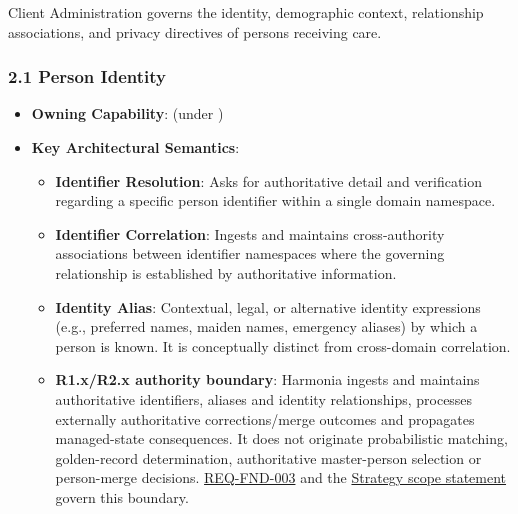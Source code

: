 Client Administration governs the identity, demographic context, relationship associations, and privacy directives of persons receiving care.

\label{rad:em:15}
\subsubsection*{2.1 Person Identity}
\label{rad:em:16}

\begin{itemize}

\item
\textbf{Owning Capability}: \texttt{} (under \texttt{})



\item
\textbf{Key Architectural Semantics}:


\begin{itemize}

\item
\textbf{Identifier Resolution}: Asks for authoritative detail and verification regarding a specific person identifier within a single domain namespace.



\item
\textbf{Identifier Correlation}: Ingests and maintains cross-authority associations between identifier namespaces where the governing relationship is established by authoritative information.



\item
\textbf{Identity Alias}: Contextual, legal, or alternative identity expressions (e.g., preferred names, maiden names, emergency aliases) by which a person is known. It is conceptually distinct from cross-domain correlation.



\item
\textbf{R1.x/\allowbreak{}R2.x authority boundary}: Harmonia ingests and maintains authoritative identifiers, aliases and identity relationships, processes externally authoritative corrections/\allowbreak{}merge outcomes and propagates managed-state consequences. It does not originate probabilistic matching, golden-record determination, authoritative master-person selection or person-merge decisions. \href{https://github.com/fhirfactory/harmonia/blob/98410db60155198a75f74c79d98060070209faa1/docs/markdown/01-motivation/requirements-constraints/foundational-requirements.md\#req-fnd-003-subject-referential-integrity}{REQ-FND-003} and the \hyperref[rad:enabling:59]{Strategy scope statement} govern this boundary.




\end{itemize}
\end{itemize}
